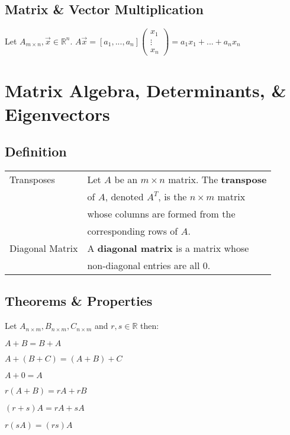 \documentclass[5pt]{article}
\begin{document}
\begin{multicols}{2}
\subsection{Matrix \& Vector Multiplication}
Let $A_{m\times n}, \vec{x}\in\mathbb{R}^n$. $A\vec{x}=\left[a_1, ...,a_n\right]\begin{pmatrix}x_1\\ \vdots\\ x_n\end{pmatrix}=a_1x_1 + ... + a_nx_n$


\section{Matrix Algebra, Determinants, \& Eigenvectors}
\subsection{Definition}
\begin{tabular}{ll}
  Transposes                & Let $A$ be an $m\times n$ matrix. The \textbf{transpose}\\
                            & of $A$, denoted $A^T$, is the $n\times m$ matrix\\
                            & whose columns are formed from the\\
                            & corresponding rows of $A$.\\
  Diagonal Matrix           & A \textbf{diagonal matrix} is a matrix whose\\
                            & non-diagonal entries are all 0.
\end{tabular}

\subsection{Theorems \& Properties}
\begin{properties}
  Let $A_{n\times m},B_{n\times m},C_{n\times m}$ and $r,s\in\mathbb{R}$ then:
  \begin{itemize*}
    \item $A+B=B+A$
    \item $A+(B+C)=(A+B)+C$
    \item $A+0=A$
    \item $r(A+B)=rA+rB$
    \item $(r+s)A=rA+sA$
    \item $r(sA)=(rs)A$
  \end{itemize*}
\end{properties}



\end{multicols}
\end{document}
